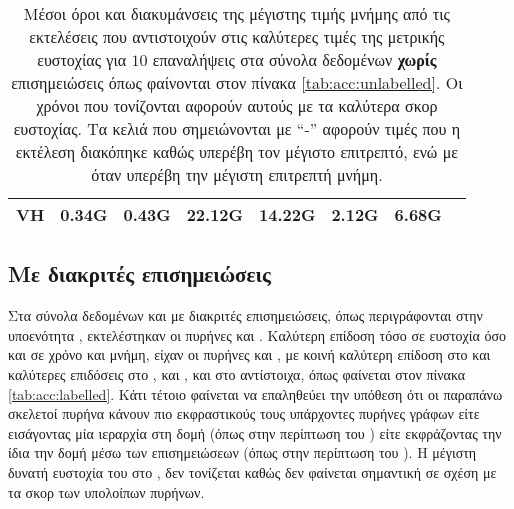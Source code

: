 \begin{table}[]
\begin{adjustbox}{angle=90}
{{\begin{tabular}{|l|c|c|c|c|c|c|c|}
VH              &           0.34G &          0.43G &           22.12G &           14.22G &           2.12G &           6.68G \\\hline
\end{tabular}
}
}
\end{adjustbox}
\caption[Μέσοι όροι και διακυμάνσεις της μέγιστης τιμής μνήμης από τις εκτελέσεις που αντιστοιχούν στις καλύτερες τιμές της μετρικής ευστοχίας για $10$ επαναλήψεις  στα σύνολα δεδομένων χωρίς επισημειώσεις.]{\small Μέσοι όροι και διακυμάνσεις της μέγιστης τιμής μνήμης από τις εκτελέσεις που αντιστοιχούν στις καλύτερες τιμές της μετρικής ευστοχίας για $10$ επαναλήψεις  στα σύνολα δεδομένων \textbf{χωρίς} επισημειώσεις όπως φαίνονται στον πίνακα \ref{tab:acc:unlabelled}. Οι χρόνοι που τονίζονται αφορούν αυτούς με τα καλύτερα σκορ ευστοχίας. Τα κελιά που σημειώνονται με ``-'' αφορούν τιμές που η εκτέλεση διακόπηκε καθώς υπερέβη τον μέγιστο επιτρεπτό, ενώ με  όταν υπερέβη την μέγιστη επιτρεπτή μνήμη.}
\label{tab:mem:unlabelled}
\end{table}


\subsection{Με διακριτές επισημειώσεις}
Στα σύνολα δεδομένων  και  με διακριτές επισημειώσεις, όπως περιγράφονται στην υποενότητα \label{ssec:lab}, εκτελέστηκαν οι πυρήνες  και .
Καλύτερη επίδοση τόσο σε ευστοχία όσο και σε χρόνο και μνήμη, είχαν οι πυρήνες  και , με κοινή καλύτερη επίδοση στο  και καλύτερες επιδόσεις στο ,  και , και στο  αντίστοιχα, όπως φαίνεται στον πίνακα \ref{tab:acc:labelled}.
Κάτι τέτοιο φαίνεται να επαληθεύει την υπόθεση ότι οι παραπάνω σκελετοί πυρήνα κάνουν πιο εκφραστικούς τους υπάρχοντες πυρήνες γράφων είτε εισάγοντας μία ιεραρχία στη δομή (όπως στην περίπτωση του ) είτε εκφράζοντας την ίδια την δομή μέσω των επισημειώσεων (όπως στην περίπτωση του ).
Η μέγιστη δυνατή ευστοχία του  στο , δεν τονίζεται καθώς δεν φαίνεται σημαντική σε σχέση με τα σκορ των υπολοίπων πυρήνων.


